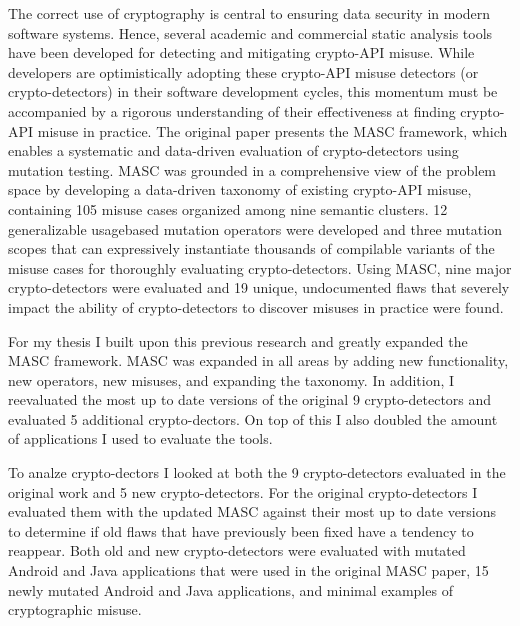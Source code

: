 \begin{large}
\noindent 
\begin{flushleft}
The correct use of cryptography is central to ensuring data security in modern software systems. Hence, several academic and commercial static analysis tools have been developed for detecting and mitigating crypto-API misuse. While developers are optimistically adopting these crypto-API misuse detectors (or crypto-detectors) in their software development cycles, this momentum must be accompanied by a rigorous understanding of their effectiveness at finding crypto-API misuse in practice. The original paper presents the MASC framework, which enables a systematic and data-driven evaluation of crypto-detectors using mutation testing. MASC was grounded in a comprehensive view of the problem space by developing a data-driven taxonomy of existing crypto-API misuse, containing 105 misuse cases organized among nine semantic clusters. 12 generalizable usagebased mutation operators were developed and three mutation scopes that can expressively instantiate thousands of compilable variants of the misuse cases for thoroughly evaluating crypto-detectors. Using MASC, nine major crypto-detectors were evaluated and 19 unique, undocumented flaws that severely impact the ability of crypto-detectors to discover misuses in practice were found.
\end{flushleft}

\begin{flushleft}
For my thesis I built upon this previous research and greatly expanded the MASC framework. MASC was expanded in all areas by adding new functionality, new operators, new misuses, and expanding the taxonomy. In addition, I reevaluated the most up to date versions of the original 9 crypto-detectors and evaluated 5 additional crypto-dectors. On top of this I also doubled the amount of applications I used to evaluate the tools.
\end{flushleft}
\begin{flushleft}
To analze crypto-dectors I looked at both the 9 crypto-detectors evaluated in the original work and 5 new crypto-detectors. For the original crypto-detectors I evaluated them with the updated MASC against their most up to date versions to determine if old flaws that have previously been fixed have a tendency to reappear. Both old and new crypto-detectors were evaluated with mutated Android and Java applications that were used in the original MASC paper, 15 newly mutated Android and Java applications, and minimal examples of cryptographic misuse.
\end{flushleft}

\end{large}